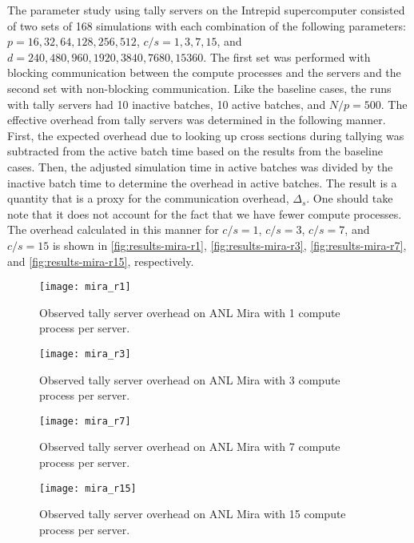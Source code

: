 \documentclass{snamc2013}
\begin{document}
The parameter study using tally servers on the Intrepid supercomputer consisted
of two sets of 168 simulations with each combination of the following
parameters: $p = 16,32,64,128,256,512$, $c/s = 1,3,7,15$, and $d = 240, 480,
960, 1920, 3840, 7680, 15360$. The first set was performed with blocking
communication between the compute processes and the servers and the second set
with non-blocking communication. Like the baseline cases, the runs with tally
servers had 10 inactive batches, 10 active batches, and $N/p = 500$. The
effective overhead from tally servers was determined in the following
manner. First, the expected overhead due to looking up cross sections during
tallying was subtracted from the active batch time based on the results from the
baseline cases. Then, the adjusted simulation time in active batches was divided
by the inactive batch time to determine the overhead in active batches. The
result is a quantity that is a proxy for the communication overhead,
$\Delta_s$. One should take note that it does not account for the fact that we
have fewer compute processes.  The overhead calculated in this manner for $c/s =
1$, $c/s = 3$, $c/s = 7$, and $c/s = 15$ is shown in \autoref{fig:results-mira-r1},
\autoref{fig:results-mira-r3}, \autoref{fig:results-mira-r7}, and
\autoref{fig:results-mira-r15}, respectively.
\begin{figure}[htb]
  \centering
  \texttt{[image: mira\_r1]}
  \caption{Observed tally server overhead on ANL Mira with 1 compute process per
    server.}
  \label{fig:results-mira-r1}
\end{figure}
\begin{figure}[htb]
  \centering
  \texttt{[image: mira\_r3]}
  \caption{Observed tally server overhead on ANL Mira with 3 compute process per
    server.}
  \label{fig:results-mira-r3}
\end{figure}
\begin{figure}[htb]
  \centering
  \texttt{[image: mira\_r7]}
  \caption{Observed tally server overhead on ANL Mira with 7 compute process per
    server.}
  \label{fig:results-mira-r7}
\end{figure}
\begin{figure}[htb]
  \centering
  \texttt{[image: mira\_r15]}
  \caption{Observed tally server overhead on ANL Mira with 15 compute process per
    server.}
  \label{fig:results-mira-r15}
\end{figure}
\end{document}
